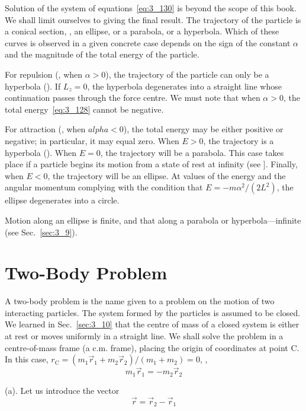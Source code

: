 Solution of the system of equations~\eqref{eq:3_130} is beyond the scope of this book. We shall limit ourselves to giving the final result. The trajectory of the particle is a conical section, \ie, an ellipse, or a parabola, or a hyperbola. Which of these curves is observed in a given concrete case depends on the sign of the constant $\alpha$ and the magnitude of the total energy of the particle.

For repulsion (\ie, when $\alpha>0$), the trajectory of the particle can only be a hyperbola (). If $L_z=0$, the hyperbola degenerates into a straight line whose continuation passes through the force centre. We must note that when $\alpha>0$, the total energy~\eqref{eq:3_128} cannot be negative.

For attraction (\ie, when $alpha<0$), the total energy may be either positive or negative; in particular, it may equal zero. When $E>0$, the trajectory is a hyperbola (). When $E=0$, the trajectory will be a parabola. This case takes place if a particle begins its motion from a state of rest at infinity (see ]. Finally, when $E<0$, the trajectory will be an ellipse. At values of the energy and the angular momentum complying with the condition that $E=- m\alpha^2/(2L^2)$, the ellipse degenerates into a circle.

Motion along an ellipse is finite, and that along a parabola or hyperbola---infinite (see Sec.~\ref{sec:3_9}).

\section{Two-Body Problem}\label{sec:3_19}

A two-body problem is the name given to a problem on the motion of two interacting particles. The system formed by the particles is assumed to be closed. We learned in Sec.~\ref{sec:3_10} that the centre of mass of a closed system is either at rest or moves uniformly in a straight line. We shall solve the problem in a centre-of-mass frame (a c.m. frame), placing the origin of coordinates at point C. In this case, $r_{\text{C}}=(m_1\vec{r}_1+m_2\vec{r}_2)/(m_1+m_2)=0$, \ie,
\begin{equation}\label{eq:3_131}
m_1\vec{r}_1 = -m_2\vec{r}_2
\end{equation}

\noindent
(a). Let us introduce the vector
\begin{equation}\label{eq:3_132}
\vec{r} = \vec{r}_2 - \vec{r}_1
\end{equation}

